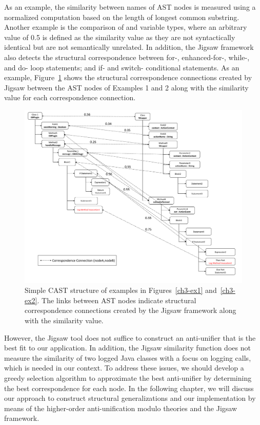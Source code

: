 As an example, the similarity between names of AST nodes is measured using a normalized computation based on the length of longest common substring. Another example is the comparison of  and  variable types, where an arbitrary value of 0.5 is defined as the similarity value as they are not syntactically identical but are not semantically unrelated. In addition, the Jigsaw framework also detects the structural correspondence between  for-, enhanced-for-, while-, and do- loop statements; and if- and switch- conditional statements. As an example, Figure~\ref{fig:meth-ast-1} shows the structural correspondence connections created by Jigsaw between the AST nodes of Examples 1 and 2 along with the similarity value for each correspondence connection.

\begin{figure} [H]
  \centering\includegraphics [width = \textwidth]{Drawing4/FirstCorr.pdf}
  \caption{Simple CAST structure of examples in Figures~\ref{ch3-ex1} and~\ref{ch3-ex2}. The links between AST nodes indicate structural correspondence connections created by the Jigsaw framework along with the similarity value.}
  \label{fig:meth-ast-1}
\end{figure}

However, the Jigsaw tool does not suffice to construct an anti-unifier that is the best fit to our application. In addition, the Jigsaw similarity function does not measure the similarity of two logged Java classes with a focus on logging calls, which is needed in our context. To address these issues, we should develop a greedy selection algorithm to approximate the best anti-unifier by determining the best correspondence for each node. In the following chapter, we will discuss our approach to construct structural generalizations and our implementation by means of the higher-order anti-unification modulo theories and the Jigsaw framework.

